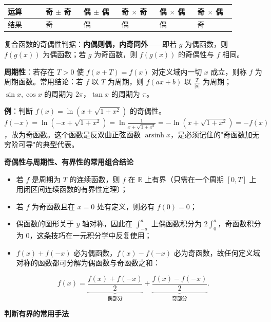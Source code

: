 \documentclass[11pt,openany,UTF8]{ctexbook}
\begin{document}
\begingroup\small\setlength{\tabcolsep}{4.0pt}
\begin{longtable}{@{}L{0.1462\linewidth}L{0.1462\linewidth}L{0.1462\linewidth}L{0.1462\linewidth}L{0.1462\linewidth}L{0.1462\linewidth}@{}}
\toprule
\textbf{运算} & \textbf{奇 $\pm$ 奇} & \textbf{偶 $\pm$ 偶} & \textbf{奇 $\times$ 奇} & \textbf{偶 $\times$ 偶} & \textbf{奇 $\times$ 偶} \\
\midrule
\endhead
结果 & 奇 & 偶 & 偶 & 偶 & 奇 \\
\bottomrule
\end{longtable}
\endgroup

复合函数的奇偶性判据：\textbf{内偶则偶，内奇同外}——即若 $g$ 为偶函数，则 $f(g(x))$ 为偶函数；若 $g$ 为奇函数，则 $f(g(x))$ 的奇偶性与 $f$ 相同。

\textbf{周期性}：若存在 $T>0$ 使 $f(x+T)=f(x)$ 对定义域内一切 $x$ 成立，则称 $f$ 为周期函数。常用结论：若 $f$ 以 $T$ 为周期，则 $f(ax+b)$ 以 $\frac{T}{\vert a\vert}$ 为周期；$\sin x,\cos x$ 的周期为 $2\pi$，$\tan x$ 的周期为 $\pi$。

\textbf{例}：判断 $f(x)=\ln\left(x+\sqrt{1+x^2}\right)$ 的奇偶性。 $f(-x)=\ln\left(-x+\sqrt{1+x^2}\right)=\ln\frac{1}{x+\sqrt{1+x^2}}=-\ln\left(x+\sqrt{1+x^2}\right)=-f(x)$，故为奇函数。这个函数是反双曲正弦函数 $\operatorname{arsinh}x$，是必须记住的"奇函数加无穷阶可导"的典型代表。

\textbf{奇偶性与周期性、有界性的常用组合结论}

\begin{itemize}
\item 若 $f$ 是周期为 $T$ 的连续函数，则 $f$ 在 $\mathbb{R}$ 上有界（只需在一个周期 $[0,T]$ 上用闭区间连续函数的有界性定理）；
\item 若 $f$ 为奇函数且在 $x=0$ 处有定义，则必有 $f(0)=0$；
\item 偶函数的图形关于 $y$ 轴对称，因此在 $\int_{-a}^{a}$ 上偶函数积分为 $2\int_0^a$，奇函数积分为 $0$，这条技巧在一元积分学中反复使用；
\item $f(x)+f(-x)$ 必为偶函数，$f(x)-f(-x)$ 必为奇函数，故任何定义域对称的函数都可分解为偶函数与奇函数之和：
\end{itemize}
\[f(x)=\underbrace{\frac{f(x)+f(-x)}{2}}_{\text{偶部分}}+\underbrace{\frac{f(x)-f(-x)}{2}}_{\text{奇部分}} .\]

\textbf{判断有界的常用手法}
\end{document}
